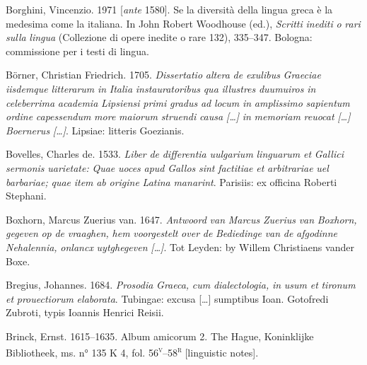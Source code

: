 Borghini, Vincenzio. 1971 [\textit{ante} 1580]. Se la diversità della lingua greca è la medesima come la italiana. In John Robert Woodhouse (ed.), \textit{Scritti} \textit{inediti} \textit{o} \textit{rari} \textit{sulla} \textit{lingua} (Collezione di opere inedite o rare 132), 335–347. Bologna: commissione per i testi di lingua.

Börner, Christian Friedrich. 1705. \textit{Dissertatio} \textit{altera} \textit{de} \textit{exulibus} \textit{Graeciae} \textit{iisdemque} \textit{litterarum} \textit{in} \textit{Italia} \textit{instauratoribus} \textit{qua} \textit{illustres} \textit{duumuiros} \textit{in} \textit{celeberrima} \textit{academia} \textit{Lipsiensi} \textit{primi} \textit{gradus} \textit{ad} \textit{locum} \textit{in} \textit{amplissimo} \textit{sapientum} \textit{ordine} \textit{capessendum} \textit{more} \textit{maiorum} \textit{struendi} \textit{causa} \textit{[…]} \textit{in} \textit{memoriam} \textit{reuocat} \textit{[…]} \textit{Boernerus} \textit{[…]}. Lipsiae: litteris Goezianis.

Bovelles, Charles de. 1533. \textit{Liber} \textit{de} \textit{differentia} \textit{uulgarium} \textit{linguarum} \textit{et} \textit{Gallici} \textit{sermonis} \textit{uarietate:} \textit{Quae} \textit{uoces} \textit{apud} \textit{Gallos} \textit{sint} \textit{factitiae} \textit{et} \textit{arbitrariae} \textit{uel} \textit{barbariae;} \textit{quae} \textit{item} \textit{ab} \textit{origine} \textit{Latina} \textit{manarint}. Parisiis: ex officina Roberti Stephani.

Boxhorn, Marcus Zuerius van. 1647. \textit{Antwoord} \textit{van} \textit{Marcus} \textit{Zuerius} \textit{van} \textit{Boxhorn,} \textit{gegeven} \textit{op} \textit{de} \textit{vraaghen,} \textit{hem} \textit{voorgestelt} \textit{over} \textit{de} \textit{Bediedinge} \textit{van} \textit{de} \textit{afgodinne} \textit{Nehalennia,} \textit{onlancx} \textit{uytghegeven} \textit{[…]}. Tot Leyden: by Willem Christiaens vander Boxe.

Bregius, Johannes. 1684. \textit{Prosodia} \textit{Graeca,} \textit{cum} \textit{dialectologia,} \textit{in} \textit{usum} \textit{et} \textit{tironum} \textit{et} \textit{prouectiorum} \textit{elaborata}. Tubingae: excusa […] sumptibus Ioan. Gotofredi Zubroti, typis Ioannis Henrici Reisii.

Brinck, Ernst. 1615–1635. Album amicorum 2. The Hague, Koninklijke Bibliotheek, ms. n° 135 K 4, fol. 56\textsc{\textsuperscript{v}}–58\textsc{\textsuperscript{r}} [linguistic notes].

